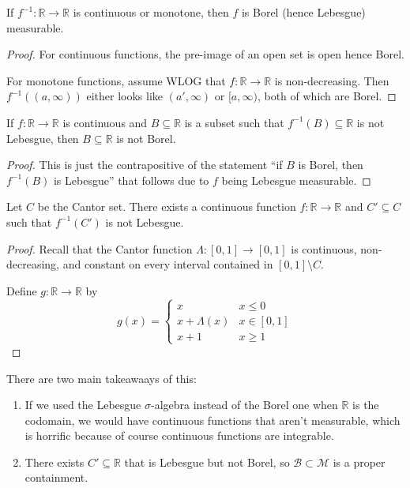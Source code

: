 \documentclass[11pt]{scrartcl}
\providecommand{\RR}{\mathbb R}
\providecommand{\ii}{\item}
\providecommand{\inv}{^{-1}}
\begin{document}
\begin{corollary}
    \label{coro:cont-monotone-meas}
    If $f\inv\colon\RR\to\RR$ is continuous or monotone,
    then $f$ is Borel (hence Lebesgue) measurable.
\end{corollary}

\begin{proof}
    For continuous functions, the pre-image of an open set is
    open hence Borel.

    For monotone functions, assume WLOG that $f\colon\RR\to\RR$ is
    non-decreasing. Then $f\inv((a,\infty))$ either looks like
    $(a',\infty)$ or $[a,\infty)$, both of which are Borel.
\end{proof}

\begin{corollary}
    \label{coro:contrapositive-measurable}
    If $f\colon\RR\to\RR$ is continuous and $B\subseteq\RR$
    is a subset such that $f\inv(B)\subseteq\RR$ is not Lebesgue,
    then $B\subseteq\RR$ is not Borel.
\end{corollary}

\begin{proof}
    This is just the contrapositive of the statement
    ``if $B$ is Borel, then $f\inv(B)$ is Lebesgue''
    that follows due to $f$ being Lebesgue measurable.
\end{proof}

\begin{prop}
    \label{prop:lebesgue-not-borel-set}
    Let $C$ be the Cantor set.
    There exists a continuous function $f\colon\RR\to\RR$
    and $C'\subseteq C$ such that $f\inv(C')$ is not Lebesgue.
\end{prop}

\begin{proof}
    Recall that the Cantor function $\Lambda\colon[0,1]\to[0,1]$
    is continuous, non-decreasing, and constant on
    every interval contained in $[0,1]\setminus C$.

    Define $g\colon\RR\to\RR$ by
    \begin{equation*}
        g(x) = \begin{cases}
	    x & x\le 0\\
	    x + \Lambda(x) & x\in[0,1]\\
	    x + 1 & x\ge 1
        \end{cases}
    \end{equation*}
\end{proof}

There are two main takeawaays of this:
\begin{enumerate}[(1)]
    \ii If we used the Lebesgue $\sigma$-algebra instead of the Borel one
    when $\RR$ is the codomain, we would have continuous functions
    that aren't measurable, which is horrific because of course
    continuous functions are integrable.
    \ii There exists $C'\subseteq\RR$ that is Lebesgue but not Borel,
    so $\mathcal B\subset\mathcal M$ is a proper containment.
\end{enumerate}
\end{document}
